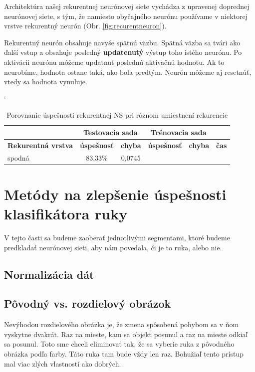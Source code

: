 Architektúra našej rekurentnej neurónovej siete vychádza z upravenej doprednej neurónovej siete, s tým, že namiesto obyčajného neurónu používame v niektorej vrstve rekurentný neurón (Obr. \ref{fig:recurentneuron}).

Rekurentný neurón obsahuje navyše spätnú väzbu. Spätná väzba sa tvári ako ďalší vstup a obsahuje posledný \textbf{updatenutý} výstup toho istého neurónu. Po aktivácii neurónu môžeme updatnuť poslednú aktivačnú hodnotu. Ak to neurobíme, hodnota ostane taká, ako bola predtým. Neurón môžeme aj resetnúť, vtedy sa hodnota vynuluje.

\begin{table}[h]
\catcode` %
\centering
\begin{tabular}{|l|c|c|c|c|c|}
\cline{2-5}
\multicolumn{1}{l}{} & \multicolumn{2}{|c|}{\textbf{Testovacia sada}} & \multicolumn{2}{c|}{\textbf{Trénovacia sada}} & \multicolumn{1}{l}{}\\ 
\hline
\textbf{Rekurentná vrstva} & \textbf{úspešnosť} & \textbf{chyba} & \textbf{úspešnosť} & \textbf{chyba} & \textbf{čas} \\ \hline
spodná & 83,33\% & 0,0745 & & &\\ \hline
\end{tabular}
\caption{Porovnanie úspešnosti rekurentnej NS pri rôznom umiestnení rekurencie}
\label{tab:neuroncountcmp2}
\end{table}


\section{Metódy na zlepšenie úspešnosti klasifikátora ruky}
\label{sect:metodyzlepseniaklasifikacie}

V tejto časti sa budeme zaoberať jednotlivými segmentami, ktoré budeme predkladať neurónovej sieti, aby nám povedala, či je to ruka, alebo nie.

\subsection{Normalizácia dát}

\subsection{Pôvodný vs. rozdielový obrázok}
Nevýhodou rozdielového obrázka je, že zmena spôsobená pohybom sa v ňom vyskytne dvakrát. Raz na mieste, kam sa objekt posunul a raz na mieste odkiaľ sa posunul. Toto sme chceli eliminovať tak, že sa vyberie ruka z pôvodného obrázka podľa farby. Táto ruka tam bude vždy len raz. Bohužiaľ tento prístup mal viac zlých vlastností ako dobrých.

